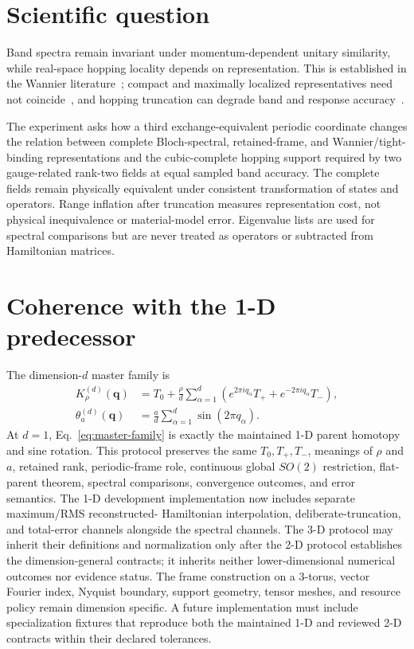 \documentclass[11pt]{article}
\begin{document}
\section{Scientific question}

Band spectra remain invariant under momentum-dependent unitary similarity, while
real-space hopping locality depends on representation. This is established in the
Wannier literature~\cite{marzari1997,marzari2012,marrazzo2024}; compact and maximally
localized representatives need not coincide~\cite{sathe2024}, and hopping truncation can
degrade band and response accuracy~\cite{ghosh2025}.

The experiment asks how a third exchange-equivalent periodic coordinate changes the
relation between complete Bloch-spectral, retained-frame, and Wannier/tight-binding
representations and the cubic-complete hopping support required by two gauge-related
rank-two fields at equal sampled band accuracy. The complete fields remain physically
equivalent under consistent transformation of states and operators. Range inflation
after truncation measures representation cost, not physical inequivalence or
material-model error. Eigenvalue lists are used for spectral comparisons but are never
treated as operators or subtracted from Hamiltonian matrices.

\section{Coherence with the 1-D predecessor}

The dimension-$d$ master family is
\begin{align}
 K_\rho^{(d)}(\mathbf q)
 &=T_0+\frac\rho d\sum_{\alpha=1}^{d}
 \left(e^{2\pi iq_\alpha}T_+ +e^{-2\pi iq_\alpha}T_-\right),\\
 \theta_a^{(d)}(\mathbf q)
 &=\frac a d\sum_{\alpha=1}^{d}\sin(2\pi q_\alpha).
 \label{eq:master-family}
\end{align}
At $d=1$, Eq.~\eqref{eq:master-family} is exactly the maintained 1-D parent homotopy
and sine rotation. This protocol preserves the same $T_0,T_+,T_-$, meanings of $\rho$
and $a$, retained rank, periodic-frame role, continuous global $SO(2)$ restriction,
flat-parent theorem, spectral comparisons, convergence outcomes, and error semantics.
The 1-D development implementation now includes separate maximum/RMS reconstructed-
Hamiltonian interpolation, deliberate-truncation, and total-error channels alongside the
spectral channels. The 3-D protocol may inherit their definitions and normalization only
after the 2-D protocol establishes the dimension-general contracts; it inherits neither
lower-dimensional numerical outcomes nor evidence status. The frame construction on a
3-torus, vector Fourier index, Nyquist boundary, support geometry, tensor meshes, and
resource policy remain dimension specific. A future implementation must include
specialization fixtures that reproduce both the maintained 1-D and reviewed 2-D
contracts within their declared tolerances.
\end{document}

